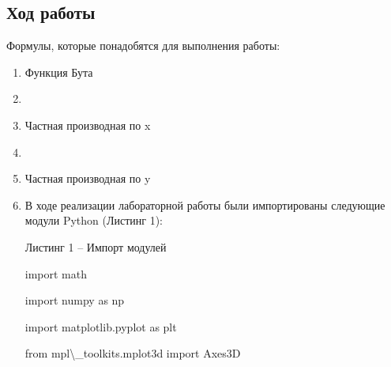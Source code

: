 \documentclass{article}%
\begin{document}
\subsection{Ход работы}%
\begin{flushleft}%
Формулы, которые понадобятся для выполнения работы:%
%
\end{flushleft}%
\begin{enumerate}%
\item Функция Бута %
%
\item %
\item Частная производная по x%
%
\item %
\item Частная производная по y%
%
\item %
\begin{flushleft}%
В ходе реализации лабораторной работы были импортированы следующие модули Python (Листинг 1):%
%
\end{flushleft}%
\begin{flushleft}%
Листинг 1 – Импорт модулей%
%
\end{flushleft}%
\begin{flushleft}%
import math%
%
\end{flushleft}%
\begin{flushleft}%
import numpy as np%
%
\end{flushleft}%
\begin{flushleft}%
import matplotlib.pyplot as plt%
%
\end{flushleft}%
\begin{flushleft}%
from mpl\textbackslash{}_toolkits.mplot3d import Axes3D%
%
\end{flushleft}%
\begin{flushleft}%

\end{flushleft}
\end{enumerate}
\end{document}
